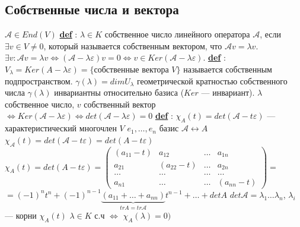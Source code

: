 \documentclass[12pt,a4paper]{article}
\newcommand{\bfline}[1]{\textbf{\underline{#1}}}
\newcommand{\Def}{\bfline{def} }
\begin{document}
\subsection{Собственные числа и вектора}
$\mathcal{A} \in End(V)$ \newline
\Def : $\lambda \in K$ собственное число линейного оператора $\mathcal{A}$, если $\exists v \in V \neq 0$, который называется собственным вектором, что $\mathcal{A} v = \lambda v$. \newline
$\exists v: \mathcal{A} v = \lambda v \Leftrightarrow (\mathcal{A} - \lambda \varepsilon) v = 0 \Leftrightarrow v \in Ker(\mathcal{A} - \lambda \varepsilon)$. \newline
\Def : $V_{\lambda} = Ker(A - \lambda \varepsilon) = \{\text{собственные вектора } V\}$ называется собственным подпространством. \newline
$\gamma(\lambda) = dim U_{\lambda}$ геометрической кратностью собственного числа \newline
$\gamma (\lambda)$ инвариантны относительно базиса ($Ker$ --- инвариант). \newline
$\lambda$ собственное число, $v$ собственный вектор $\Leftrightarrow Ker(\mathcal{A} - \lambda \varepsilon) \Leftrightarrow det(\mathcal{A} - \lambda \varepsilon)=0$ \newline
\Def : $\chi_A (t) = det(\mathcal{A} - t\varepsilon)$ --- характеристический многочлен \newline
$V$ $e_1, \ldots, e_n$ базис $\mathcal{A} \leftrightarrow A$ \newline
$\chi_{\mathcal{A}}(t) = det(\mathcal{A} - t\varepsilon) = det(A-t\varepsilon)$ \newline
$\chi_A(t) = det(A - t\varepsilon) = 
	\left(
	\begin{matrix}
	(a_{11}-t) & a_{12} & \ldots & a_{1n} \\
	a_{21} & (a_{22} - t) & \ldots & a_{2n} \\
	\ldots & \ldots & \ldots & \ldots \\
	a_{n1} & \ldots & \ldots & (a_{n n} - t)
	\end{matrix}
	\right)= $\newline
$={(-1)}^n t^n + {(-1)}^{n-1} \underset{tr A = tr \mathcal{A}}{\underbrace{(a_{11} + \ldots + a_{nn})}} t^{n-1} + \ldots + detA$ \newline
$det \mathcal{A} = \lambda_1 \ldots \lambda_n$, $\lambda_i$ --- корни $\chi_A(t)$ \newline
$\lambda \in K$ с.ч $\Leftrightarrow$ $\chi_A(\lambda) = 0)$ \newline
\end{document}
